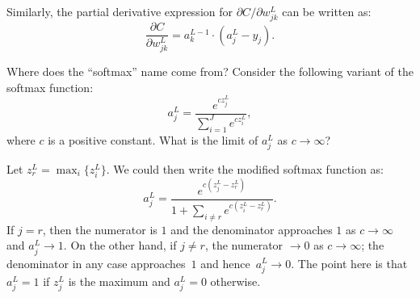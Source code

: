 Similarly, the partial derivative expression for  $\partial C / \partial w_{j k}^L$
can be written as:
\begin{equation}
\frac{\partial C}{\partial w_{j k}^L} = a_{k}^{L - 1} \cdot (a_{j}^L - y_j). 
\end{equation}

\begin{exercise}
Where does the ``softmax'' name come from? Consider the following variant 
of the softmax function:
\[
    a_j^L =  \frac{e^{c z_j^L}}{ \sum_{i = 1}^J e^{c z_i^L}},
\]
where $c$ is a positive constant. What is the limit of $a_j^L$ 
as $c \to \infty$?
\end{exercise}
\begin{solution}
Let $z_r^L = \max_i \{z_i^L\}$. We could then write the modified softmax
function as:
\[
    a_j^L =  \frac{e^{c (z_j^L - z_r^L)}}{ 1 + \sum_{i \neq r} e^{c (z_i^L - z_r^L)}}. 
\]
If $j = r$, then the numerator is $1$ and the denominator approaches $1$ as $c \to \infty$
and $a_j^L \to 1$. On the other hand, if $j \neq r$, the numerator $\to 0$ as $c \to \infty$;
the denominator in any case approaches~$1$ and hence~$a_j^L \to 0$. The point here is 
that $a_j^L = 1$ if $z_j^L$ is the maximum and $a_j^L = 0$ otherwise. 
\end{solution}

